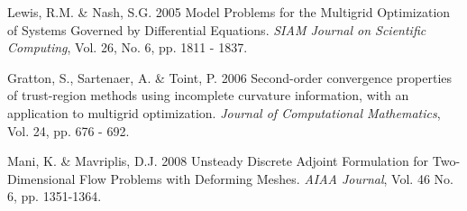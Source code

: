 \documentclass{report}
\begin{document}
\begin{thebibliography}{9}

 Lewis, R.M. \& Nash, S.G. 2005 Model Problems for the
Multigrid Optimization of Systems Governed by Differential Equations.
{\it SIAM Journal on Scientific Computing}, Vol. 26, No. 6, pp. 1811 - 1837.

 Gratton, S., Sartenaer, A. \& Toint, P. 2006
Second-order convergence properties of trust-region methods using
incomplete curvature information, with an application to multigrid
optimization.
{\it Journal of Computational Mathematics}, Vol. 24, pp. 676 - 692.

 Mani, K. \& Mavriplis, D.J. 2008 Unsteady Discrete
Adjoint Formulation for Two-Dimensional Flow Problems with Deforming
Meshes.
{\it AIAA Journal}, Vol. 46 No. 6, pp. 1351-1364.

\end{thebibliography}
\end{document}
